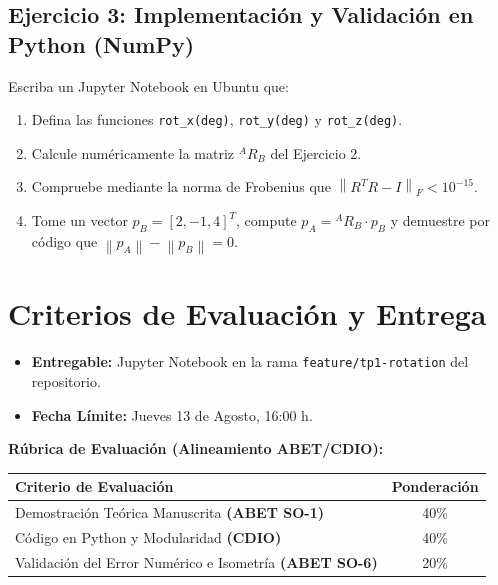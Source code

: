 \documentclass[11pt, a4paper]{article}
\begin{document}
\subsection*{Ejercicio 3: Implementación y Validación en Python (NumPy)}
Escriba un Jupyter Notebook en Ubuntu que:
\begin{enumerate}
    \item Defina las funciones \texttt{rot\_x(deg)}, \texttt{rot\_y(deg)} y \texttt{rot\_z(deg)}.
    \item Calcule numéricamente la matriz $^{A}R_B$ del Ejercicio 2.
    \item Compruebe mediante la norma de Frobenius que $\left\| R^T R - I \right\|_F < 10^{-15}$.
    \item Tome un vector $p_B = [2, -1, 4]^T$, compute $p_A = {}^{A}R_B \cdot p_B$ y demuestre por código que $\left\| p_A \right\| - \left\| p_B \right\| = 0$.
\end{enumerate}

\section{Criterios de Evaluación y Entrega}
\begin{itemize}
    \item \textbf{Entregable:} Jupyter Notebook en la rama \texttt{feature/tp1-rotation} del repositorio.
    \item \textbf{Fecha Límite:} Jueves 13 de Agosto, 16:00 h.
\end{itemize}

\vspace{0.2cm}
\noindent\textbf{Rúbrica de Evaluación (Alineamiento ABET/CDIO):}
\begin{table}[h!]
    \centering
    \begin{tabular}{@{} l c @{}}
    \toprule
    \textbf{Criterio de Evaluación} & \textbf{Ponderación} \\ \midrule
    Demostración Teórica Manuscrita \textbf{(ABET SO-1)} & 40\% \\
    Código en Python y Modularidad \textbf{(CDIO)} & 40\% \\
    Validación del Error Numérico e Isometría \textbf{(ABET SO-6)} & 20\% \\ \bottomrule
    \end{tabular}
\end{table}
\end{document}
